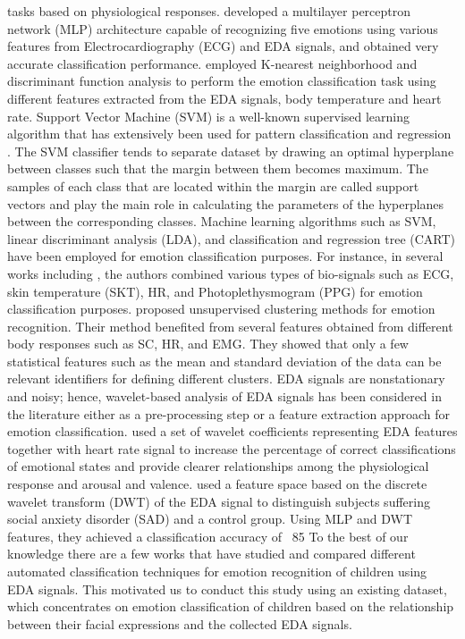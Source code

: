 tasks based on physiological responses. \cite{MultPercep2007} developed a multilayer perceptron 
network (MLP) architecture capable of recognizing five emotions using various features 
from Electrocardiography (ECG) and EDA signals, and obtained very accurate classification 
performance. \cite{EmotionRecog2004} employed K-nearest neighborhood and discriminant 
function analysis to perform the emotion classification task using different features 
extracted from the EDA signals, body temperature and heart rate.
Support Vector Machine (SVM) is a well-known supervised learning algorithm that has 
extensively been used for pattern classification and regression \cite{SupportVector1995}. The SVM classifier tends to separate dataset by drawing an optimal hyperplane 
between classes such that the margin between them becomes maximum. The samples of 
each class that are located within the margin are called support vectors and play the 
main role in calculating the parameters of the hyperplanes between the corresponding 
classes. Machine learning algorithms such as SVM, linear discriminant analysis (LDA), 
and classification and regression tree (CART) have been employed for emotion 
classification purposes. For instance, in several works including \cite{Taxonomy2011, EmotionClassifi2014}, the authors combined various types of bio-signals such as ECG, 
skin temperature (SKT), HR, and Photoplethysmogram (PPG) for  emotion classification 
purposes. \cite{FeatureSelection2006} proposed unsupervised clustering methods for emotion 
recognition. Their method benefited from several features obtained from different 
body responses such as SC, HR, and EMG. They showed that only a few statistical 
features such as the mean and standard deviation of the data can be relevant identifiers 
for defining different clusters. 
EDA signals are nonstationary and noisy; hence, wavelet-based analysis of EDA signals 
has been considered in the literature \cite{EmotionalState2013, EMGGSR2009}
either as a pre-processing step or a feature extraction approach for emotion classification. 
\cite{EmotionalState2013} used a set of wavelet coefficients representing EDA features 
together with heart rate signal to increase the percentage of correct classifications 
of emotional states and provide clearer relationships among the physiological response 
and arousal and valence. \cite{EDA2016} used a feature space based on the 
discrete wavelet transform (DWT) of the EDA signal to distinguish subjects suffering 
social anxiety disorder (SAD) and a control group. Using MLP and DWT features, they 
achieved a classification accuracy of ~85%
To the best of our knowledge there are a few works \cite{EmotionResp2013, SlowEcho2009} that have studied and compared different automated 
classification techniques for emotion recognition of children using EDA signals. 
This motivated us to conduct this study using an existing dataset, which concentrates 
on emotion classification of children based on the relationship between their facial 
expressions and the collected EDA signals.


